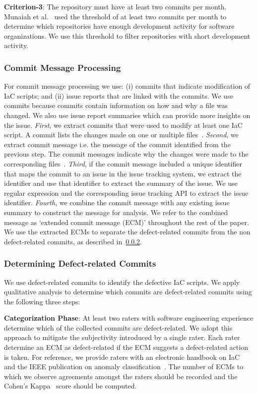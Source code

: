 \documentclass[smallextended]{svjour3}       %
\begin{document}
\textbf{Criterion-3}: The repository must have at least two commits per month. Munaiah et al.~\citep{MunaiahCuration2017} used the threshold of at least two commits per month to determine which repositories have enough development activity for software organizations. We use this threshold to filter repositories with short development activity.

\subsubsection{Commit Message Processing}
\label{commit-collect}

For commit message processing we use: (i) commits that indicate modification of IaC scripts; and (ii) issue reports that are linked with the commits. We use commits because commits contain information on how and why a file was changed. We also use issue report summaries which can provide more insights on the issue. \textit{First}, we extract commits that were used to modify at least one IaC script. A commit lists the changes made on one or multiple files~\citep{maletic:commit:icpc2008}. \textit{Second}, we extract commit message i.e. the message of the commit identified from the previous step. The commit messages indicate why the changes were made to the corresponding files~\citep{maletic:commit:icpc2008}. \textit{Third}, if the commit message included a unique identifier that maps the commit to an issue in the issue tracking system, we extract the identifier and use that identifier to extract the summary of the issue. We use regular expression and the corresponding issue tracking API to extract the issue identifier. \textit{Fourth}, we combine the commit message with any existing issue summary to construct the message for analysis. We refer to the combined message as `extended commit message (ECM)' throughout the rest of the paper. We use the extracted ECMs to separate the defect-related commits from the non defect-related commits, as described in~\ref{defect-related-commit}. 

 
\subsubsection{Determining Defect-related Commits}
\label{defect-related-commit}
We use defect-related commits to identify the defective IaC scripts. We apply qualitative analysis to determine which commits are defect-related commits using the following three steps:  

\textbf{Categorization Phase}: At least two raters with software engineering experience determine which of the collected commits are defect-related. We adopt this approach to mitigate the subjectivity introduced by a single rater. Each rater determine an ECM as defect-related if the ECM suggests a defect-related action is taken. For reference, we provide raters with an electronic handbook on IaC~\citep{puppet-doc} and the IEEE publication on anomaly classification~\citep{ieee:def}. The number of ECMs to which we observe agreements amongst the raters should be recorded and the Cohen's Kappa~\citep{cohens:kappa} score should be computed.
\end{document}
